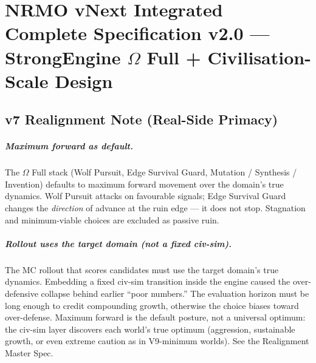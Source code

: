 
\chapter{NRMO vNext Integrated Complete Specification v2.0 ---
StrongEngine $\Omega$ Full + Civilisation-Scale Design}
\label{ch:omega-full-integrated}

\section*{v7 Realignment Note (Real-Side Primacy)}


\paragraph{Maximum forward as default.}
The $\Omega$ Full stack (Wolf Pursuit, Edge Survival Guard, Mutation /
Synthesis / Invention) defaults to maximum forward movement over the
domain's true dynamics. Wolf Pursuit attacks on favourable signals; Edge
Survival Guard changes the \emph{direction} of advance at the ruin edge ---
it does not stop. Stagnation and minimum-viable choices are excluded as
passive ruin.

\paragraph{Rollout uses the target domain (not a fixed civ-sim).}
The MC rollout that scores candidates must use the target domain's true
dynamics. Embedding a fixed civ-sim transition inside the engine caused the
over-defensive collapse behind earlier ``poor numbers.'' The evaluation
horizon must be long enough to credit compounding growth, otherwise the
choice biases toward over-defense. Maximum forward is the default posture,
not a universal optimum: the civ-sim layer discovers each world's true
optimum (aggression, sustainable growth, or even extreme caution as in
V9-minimum worlds). See the Realignment Master Spec.


